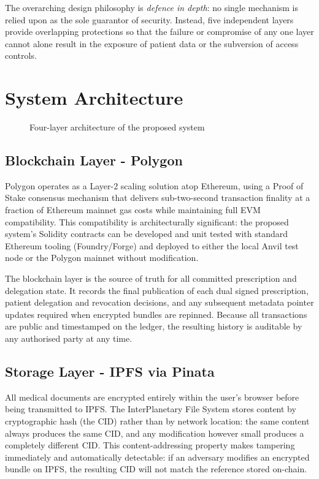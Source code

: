 \documentclass[12pt,a4wide]{report}
\begin{document}
The overarching design philosophy is \textit{defence in depth}: no single
mechanism is relied upon as the sole guarantor of security. Instead, five
independent layers provide overlapping protections so that the failure or compromise
of any one layer cannot alone result in the exposure of patient data or the
subversion of access controls.

\section{System Architecture}

\begin{figure}[p]
\centering
\caption{Four-layer architecture of the proposed system}
\label{fig:architecture}
\end{figure}
\clearpage



\subsection{Blockchain Layer - Polygon}

Polygon operates as a Layer-2 scaling solution atop Ethereum, using a
Proof of Stake consensus mechanism that delivers sub-two-second transaction
finality at a fraction of Ethereum mainnet gas costs while maintaining full EVM
compatibility. This compatibility is architecturally significant: the proposed system's
Solidity contracts can be developed and unit tested with standard Ethereum tooling
(Foundry/Forge) and deployed to either the local Anvil test node or the Polygon
mainnet without modification.

The blockchain layer is the source of truth for all committed prescription and
delegation state. It records the final publication of each dual signed
prescription, patient delegation and revocation decisions, and any subsequent
metadata pointer updates required when encrypted bundles are repinned. Because
all transactions are public and timestamped on the ledger, the resulting history
is auditable by any authorised party at any time.

\subsection{Storage Layer - IPFS via Pinata}

All medical documents are encrypted entirely within the user's browser before
being transmitted to IPFS. The InterPlanetary File System stores content by
cryptographic hash (the CID) rather than by network location: the same content
always produces the same CID, and any modification however small produces
a completely different CID. This content-addressing property makes tampering
immediately and automatically detectable: if an adversary modifies an encrypted
bundle on IPFS, the resulting CID will not match the reference stored on-chain.
\end{document}
